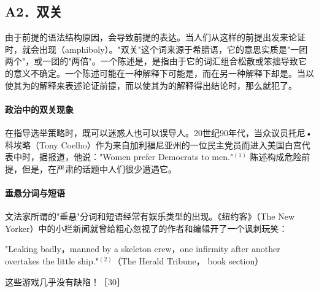 \subsection{A2．双关}

\begin{theorembox}[title=双关谬误的定义]
由于前提的语法结构原因，会导致前提的表达。当人们从这样的前提出发来论证时，就会出现（amphiboly）。"双关"这个词来源于希腊语，它的意思实质是"一团两个"，或一团的"两倍"。一个陈述是，是指由于它的词汇组合松散或笨拙导致它的意义不确定。一个陈述可能在一种解释下可能是，而在另一种解释下却是。当以使其为的解释来表述论证前提，而以使其为的解释得出结论时，那么就犯了。
\end{theorembox}

\paragraph{政治中的双关现象}
\begin{examplebox}[title=政治中的双关现象]
在指导选举策略时，既可以迷惑人也可以误导人。20世纪90年代，当众议员托尼•科埃略（Tony Coelho）作为来自加利福尼亚州的一位民主党员而进入美国白宫代表中时，据报道，他说："Women prefer Democrats to men."${ }^{(1)}$ 陈述构成危险前提，但是，在严肃的话题中人们很少遭遇它。
\end{examplebox}

\paragraph{垂悬分词与短语}
\begin{examplebox}[title=垂悬分词与短语]
文法家所谓的"垂悬"分词和短语经常有娱乐类型的出现。《纽约客》（The New Yorker）中的小栏新闻就曾给粗心忽视了的作者和编辑开了一个讽刺玩笑：

"Leaking badly，manned by a skeleton crew，one infirmity after another overtakes the little ship."${ }^{(2)}$（The Herald Tribune， book section）

这些游戏几乎没有缺陷！［30］
\end{examplebox}

